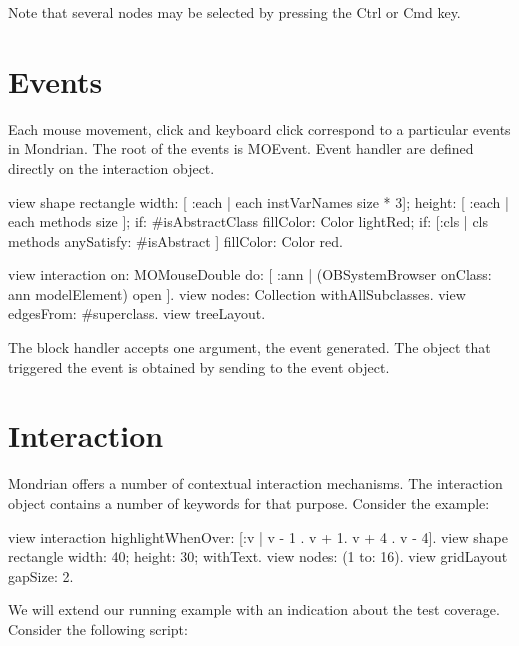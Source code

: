 \documentclass[a4paper,10pt,twoside]{book}
\begin{document}
Note that several nodes may be selected by pressing the Ctrl or Cmd key.

\section{Events}
Each mouse movement, click and keyboard click correspond to a particular events in Mondrian. The root of the events is MOEvent. Event handler are defined directly on the interaction object.  

\begin{code}{}
view shape rectangle
  width: [ :each | each instVarNames size * 3];
  height: [ :each | each methods size ];
  if: #isAbstractClass fillColor: Color lightRed;
  if: [:cls | cls methods anySatisfy: #isAbstract ] fillColor: Color red.
  
view interaction on: MOMouseDouble do: [ :ann | 
  (OBSystemBrowser onClass: ann modelElement) open
].
view nodes: Collection withAllSubclasses.
view edgesFrom: #superclass.
view treeLayout.
\end{code}

The block handler accepts one argument, the event generated. The object that triggered the event is obtained by sending  to the event object. 

\section{Interaction}
Mondrian offers a number of contextual interaction mechanisms. The interaction object contains a number of keywords for that purpose. Consider the example:

\begin{code}{}
view interaction 
  highlightWhenOver: [:v | {v - 1 . v + 1. v + 4 . v - 4}].
view shape rectangle 
  width: 40;
  height: 30;
  withText.
view nodes: (1 to: 16).
view gridLayout gapSize: 2.
\end{code}

We will extend our running example with an indication about the test coverage. Consider the following script:
\end{document}
